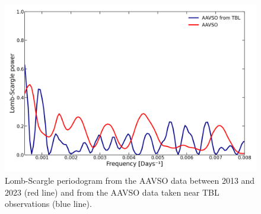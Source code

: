 \documentclass{aa}
\begin{document}
\begin{figure}[!h]
    \centering
    \includegraphics[width=\linewidth]{Lomb-Scargle-TBL.png}
    \caption{Lomb-Scargle periodogram from the AAVSO data between 2013 and 2023 (red line) and from the AAVSO data taken near TBL observations (blue line).}
    \label{LSAAVSO}
\end{figure}

\end{document}
